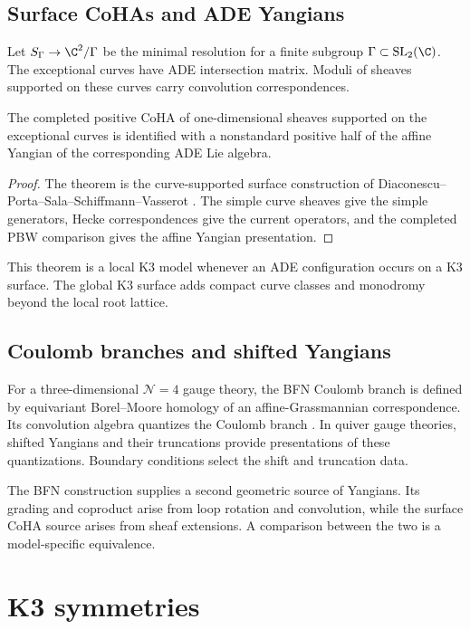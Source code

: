 \chapter{Surface CoHAs and ADE Yangians}
Let $S_\Gamma\to\C^2/\Gamma$ be the minimal resolution for a finite subgroup $\Gamma\subset\operatorname{SL}_2(\C)$. The exceptional curves have ADE intersection matrix. Moduli of sheaves supported on these curves carry convolution correspondences.

\begin{theorem}
The completed positive CoHA of one-dimensional sheaves supported on the exceptional curves is identified with a nonstandard positive half of the affine Yangian of the corresponding ADE Lie algebra.
\end{theorem}
\begin{proof}
The theorem is the curve-supported surface construction of Diaconescu--Porta--Sala--Schiffmann--Vasserot \cite{DPPSSV}. The simple curve sheaves give the simple generators, Hecke correspondences give the current operators, and the completed PBW comparison gives the affine Yangian presentation.
\end{proof}

This theorem is a local K3 model whenever an ADE configuration occurs on a K3 surface. The global K3 surface adds compact curve classes and monodromy beyond the local root lattice.

\chapter{Coulomb branches and shifted Yangians}
For a three-dimensional $\mathcal N=4$ gauge theory, the BFN Coulomb branch is defined by equivariant Borel--Moore homology of an affine-Grassmannian correspondence. Its convolution algebra quantizes the Coulomb branch \cite{BFN}. In quiver gauge theories, shifted Yangians and their truncations provide presentations of these quantizations. Boundary conditions select the shift and truncation data.

The BFN construction supplies a second geometric source of Yangians. Its grading and coproduct arise from loop rotation and convolution, while the surface CoHA source arises from sheaf extensions. A comparison between the two is a model-specific equivalence.

\part{K3 symmetries}

